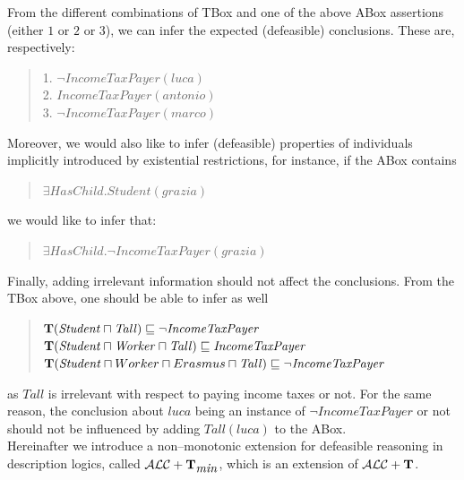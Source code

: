 \documentclass[a4paper, 11pt, oneside]{duthesis}
\newcommand{\tip}{{\bf T}}
\newcommand{\alct}{\mathcal{ALC}+\tip}
\newcommand{\alctmin}{\mathcal{ALC}+\tip_{\mbox{\em min}}}
\newcommand{\sqset}{\sqsubseteq}
\newcommand{\mint}{\sqcap}
\begin{document}
\noindent From the different combinations of TBox and one of the above ABox assertions (either $1$ or $2$ or $3$), we can infer the expected (defeasible) conclusions. These are, respectively:

\begin{quote}
1. $\mathit{\neg IncomeTaxPayer}(\mathit{luca})$\\
2. $\mathit{IncomeTaxPayer}(\mathit{antonio})$ \\
3. $\mathit{\neg IncomeTaxPayer}(\mathit{marco})$
\end{quote}

\noindent Moreover, we would also like to infer (defeasible) properties of individuals
implicitly introduced by existential restrictions, for instance,
if the ABox contains

\begin{quote}
$\exists \mathit{HasChild}.\mathit{Student(grazia)}$
\end{quote}

\noindent we would like to infer that:
\begin{quote}
$\exists \mathit{HasChild.\neg IncomeTaxPayer(grazia)}$
\end{quote}

\noindent Finally, adding irrelevant information should not affect the conclusions. From the TBox above, one should be able to infer as well

\begin{quote}
$\tip (\mathit{Student} \mint \mathit{Tall}) \sqset \mathit{\neg IncomeTaxPayer}$\\
$\tip (\mathit{Student} \mint \mathit{Worker} \mint \mathit{Tall})  \sqset \mathit{IncomeTaxPayer}$ \\
$\tip (\mathit{Student} \mint Worker \mint Erasmus \mint \mathit{Tall})  \sqset \mathit{\neg IncomeTaxPayer}$
\end{quote}

\noindent as  $\mathit{Tall}$ is irrelevant with respect to paying income taxes or not. For the same reason, the conclusion about $\mathit{luca}$ being an instance of $\neg IncomeTaxPayer$ or not should not be influenced by adding $\mathit{Tall}(\mathit{luca})$ to the ABox.\\

Hereinafter we introduce a non--monotonic extension for defeasible reasoning in description logics, called $\alctmin$, which is an extension of $\alct$.


\newpage
\end{document}
